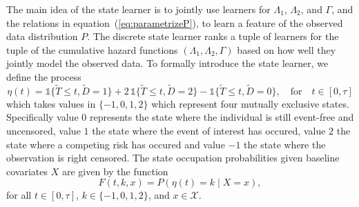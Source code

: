 \documentclass[a4paper,danish]{article}
\theoremstyle{plain} %
\numberwithin{theorem}{section}
\theoremstyle{definition} %
\theoremstyle{remark}
\newcommand{\1}{\mathds{1}}
\begin{document}
The main idea of the state learner is to jointly use learners for \(
\Lambda_1 \), \( \Lambda_2 \), and \( \Gamma \), and the relations in
equation~(\ref{eq:parametrizeP}), to learn a feature of the observed
data distribution \( P \). The discrete state learner ranks a tuple of
learners for the tuple of the cumulative hazard functions \(
(\Lambda_1, \Lambda_2, \Gamma) \) based on how well they jointly model
the observed data. To formally introduce the state learner, we define
the process 
\begin{equation*}
  \eta(t) = \1\{\tilde{T} \leq t, \tilde D=1\} + 2\,\1\{\tilde{T} \leq t, \tilde
  D=2\} - \1\{\tilde{T} \leq t, \tilde D=0\},
  \quad \text{for} \quad t \in [0, \tau]
\end{equation*} which takes values in \( \{-1,0,1,2\}\) which
represent four mutually exclusive states. Specifically value \( 0 \)
represents the state where the individual is still event-free and
uncensored, value \( 1\) the state where the event of interest has
occured, value \( 2\) the state where a competing risk has occured and
value \( -1\) the state where the observation is right censored.  The
state occupation probabilities given baseline covariates \( X \) are
given by the function
\begin{equation}
  \label{eq:F-def}
  F(t, k, x) = P(\eta(t) = k \mid X=x),
\end{equation}
for all \( t \in [0,\tau] \), \( k \in \{-1,0,1,2\} \), and
\( x \in \mathcal{X} \).
\end{document}
